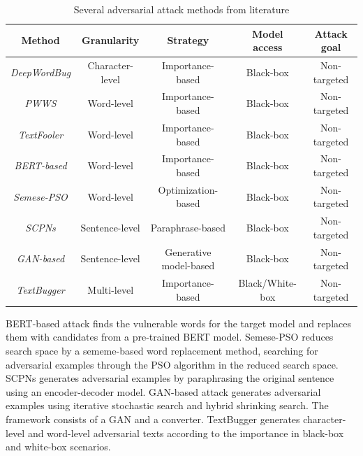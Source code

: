 \begin{table}[h]
  \footnotesize
  \centering
  \begin{tabular}{|c||c|c|c|c|}
    \hline
    \textbf{Method} & \textbf{Granularity} & \textbf{Strategy} & \textbf{Model access} & \textbf{Attack goal} \\
    \hline \hline
    \emph{DeepWordBug} & Character-level & Importance-based & Black-box & Non-targeted \\ 
    
    \emph{PWWS} & Word-level & Importance-based & Black-box & Non-targeted \\
    
    \emph{TextFooler} & Word-level & Importance-based & Black-box & Non-targeted \\
    
    \emph{BERT-based} & Word-level & Importance-based & Black-box & Non-targeted \\
    
    \emph{Semese-PSO} & Word-level & Optimization-based & Black-box & Non-targeted \\
    
    \emph{SCPNs} & Sentence-level & Paraphrase-based & Black-box & Non-targeted \\
    
    \emph{GAN-based} & Sentence-level & Generative model-based & Black-box & Non-targeted \\
    
    \emph{TextBugger} & Multi-level & Importance-based & Black/White-box & Non-targeted \\
    \hline
  \end{tabular}
  \caption{Several adversarial attack methods from literature}
\label{tab:attack-methods}
\end{table}

\vspace{0.5cm}

\noindent BERT-based attack finds the vulnerable words for the target model and replaces them with candidates from a pre-trained BERT model.
Semese-PSO reduces search space by a sememe-based word replacement method, searching for adversarial examples through the PSO algorithm in the reduced search space.
SCPNs generates adversarial examples by paraphrasing the original sentence using an encoder-decoder model.
GAN-based attack generates adversarial examples using iterative stochastic search and hybrid shrinking search. The framework consists of a GAN and a converter.
TextBugger generates character-level and word-level adversarial texts according to the importance in black-box and white-box scenarios.



